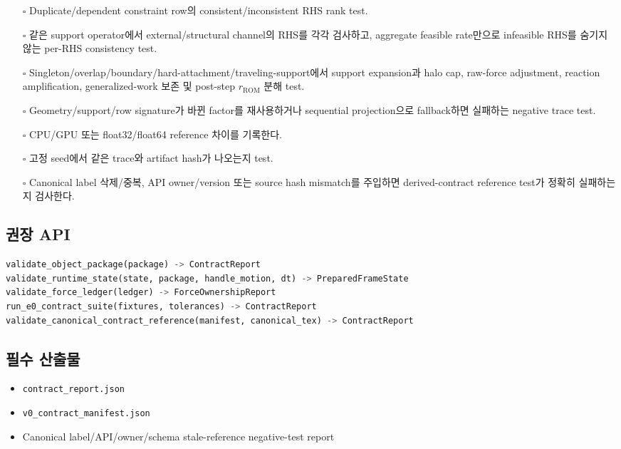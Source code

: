 \documentclass[10pt,a4paper]{article}
\newcommand{\todo}{\textcolor{TodoGray}{\(\square\)}}
\newcommand{\artifact}[1]{\textcolor{ProgressBlue}{\nolinkurl{#1}}}
\begin{document}
\begin{itemize}
  \item[\todo] Duplicate/dependent constraint row의 consistent/inconsistent RHS rank test.
  \item[\todo] 같은 support operator에서 external/structural channel의 RHS를 각각 검사하고,
  aggregate feasible rate만으로 infeasible RHS를 숨기지 않는 per-RHS consistency test.
  \item[\todo] Singleton/overlap/boundary/hard-attachment/traveling-support에서
  support expansion과 halo cap, raw-force adjustment, reaction amplification,
  generalized-work 보존 및 post-step \(r_{\mathrm{ROM}}\) 분해 test.
  \item[\todo] Geometry/support/row signature가 바뀐 factor를 재사용하거나 sequential projection으로 fallback하면 실패하는 negative trace test.
  \item[\todo] CPU/GPU 또는 float32/float64 reference 차이를 기록한다.
  \item[\todo] 고정 seed에서 같은 trace와 artifact hash가 나오는지 test.
  \item[\todo] Canonical label 삭제/중복, API owner/version 또는 source hash mismatch를 주입하면
  derived-contract reference test가 정확히 실패하는지 검사한다.
\end{itemize}

\subsection*{권장 API}

\begin{lstlisting}[language=Python]
validate_object_package(package) -> ContractReport
validate_runtime_state(state, package, handle_motion, dt) -> PreparedFrameState
validate_force_ledger(ledger) -> ForceOwnershipReport
run_e0_contract_suite(fixtures, tolerances) -> ContractReport
validate_canonical_contract_reference(manifest, canonical_tex) -> ContractReport
\end{lstlisting}

\subsection*{필수 산출물}

\begin{itemize}
  \item \artifact{contract_report.json}
  \item \artifact{v0_contract_manifest.json}
  \item Canonical label/API/owner/schema stale-reference negative-test report
\end{itemize}
\end{document}
